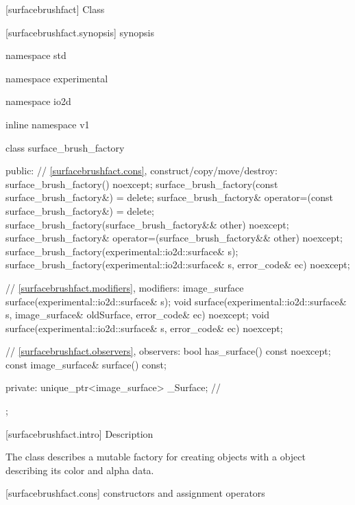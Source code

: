  [surfacebrushfact] {Class }

 [surfacebrushfact.synopsis] { synopsis}

\begin{codeblock}
namespace std { namespace experimental { namespace io2d { inline namespace v1 {
  class surface_brush_factory {
  public:
    // \ref{surfacebrushfact.cons}, construct/copy/move/destroy:
    surface_brush_factory() noexcept;
    surface_brush_factory(const surface_brush_factory&) = delete;
    surface_brush_factory& operator=(const surface_brush_factory&) = delete;
    surface_brush_factory(surface_brush_factory&& other) noexcept;
    surface_brush_factory& operator=(surface_brush_factory&& other) noexcept;
    surface_brush_factory(experimental::io2d::surface& s);
    surface_brush_factory(experimental::io2d::surface& s, error_code& ec) noexcept;
    
    // \ref{surfacebrushfact.modifiers}, modifiers:
    image_surface surface(experimental::io2d::surface& s);
    void surface(experimental::io2d::surface& s, image_surface& oldSurface, error_code& ec) noexcept;
    void surface(experimental::io2d::surface& s, error_code& ec) noexcept;
    
    // \ref{surfacebrushfact.observers}, observers:
    bool has_surface() const noexcept;
    const image_surface& surface() const;
    
  private:
    unique_ptr<image_surface> _Surface; // \expos
  };
} } } }
\end{codeblock}

 [surfacebrushfact.intro] { Description}

\pnum
{}
The class  describes a mutable factory for creating  objects with a  object describing its color and alpha data.

 [surfacebrushfact.cons] { constructors and assignment operators}


